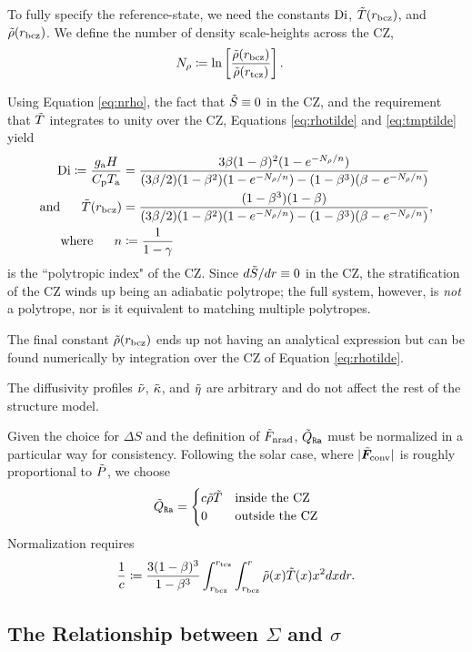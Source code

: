 \documentclass[12pt]{article}
\numberwithin{equation}{section}
\newcommand{\tmpa}{T_{\rm a}}
\newcommand{\ga}{g_{\rm a}}
\begin{document}
To fully specify the reference-state, we need the constants ${\rm{Di}}$, $\tilde{T}(r_{\rm bcz})$, and $\tilde{\rho}(r_{\rm bcz})$. We define the number of density scale-heights across the CZ, 
\begin{align}\label{eq:nrho}
	N_\rho &\coloneqq \ln\left[\frac{\tilde{\rho}(r_{\rm bcz})}{\tilde{\rho}(r_{\rm tcz})}\right].
\end{align}

Using Equation \eqref{eq:nrho}, the fact that $\tilde{S}\equiv0$ in the CZ, and the requirement that $\tilde{T}$ integrates to unity over the CZ, Equations \eqref{eq:rhotilde} and \eqref{eq:tmptilde} yield
\begin{align}\label{eq:digory}
	\di \define \frac{\ga H}{\cpcap\tmpa} &=  \frac{3 \beta (1 - \beta)^2 (1 - e^{-\nrho/n})} 
	{ (3\beta/2) (1 - \beta^2) (1 - e^{-\nrho/n}) - (1-\beta^3)(\beta-e^{-\nrho/n})}\\
	\andd \tmptilde(\rbcz)&= \frac{(1-\beta^3)(1-\beta)}{(3\beta/2)(1-\beta^2)(1-e^{-\nrho/n}) - (1-\beta^3)(\beta - e^{-\nrho/n})},\\
	\where n &\define \frac{1}{1-\gamma}
\end{align}
is the ``polytropic index" of the CZ. Since $d\tilde{S}/dr\equiv0$ in the CZ, the stratification of the CZ winds up being an adiabatic polytrope; the full system, however, is \textit{not} a polytrope, nor is it equivalent to matching multiple polytropes.

The final constant $\tilde{\rho}(r_{\rm bcz})$ ends up not having an analytical expression but can be found numerically by integration over the CZ of Equation \eqref{eq:rhotilde}.  

The diffusivity profiles $\tilde{\nu}$, $\tilde{\kappa}$, and $\tilde{\eta}$ are arbitrary and do not affect the rest of the structure model. 

Given the choice for $\Delta S$ and the definition of $\tilde{F}_{\rm nrad}$, $\tilde{Q}_{\texttt{Ra}}$ must be normalized in a particular way for consistency. Following the solar case, where $|\tilde{\bm{F}}_{\rm conv}|$ is roughly proportional to $\tilde{P}$, we choose
\begin{align}
	\tilde{Q}_{\texttt{Ra}} = \begin{cases}
		c\tilde{\rho}\tilde{T} &\text{inside the CZ}\\
		0 & \text{outside the CZ}
	\end{cases}
\end{align}
Normalization requires
\begin{align}
	\frac{1}{c} \coloneqq \frac{3(1-\beta)^3}{1-\beta^3}\int_{r_{\rm bcz}}^{r_{\rm tcz}}\int_{r_{\rm bcz}}^r \tilde{\rho}(x)\tilde{T}(x) x^2 dx dr. 
\end{align}
\subsection{The Relationship between $\Sigma$ and $\sigma$}


\clearpage
\newpage
%
	
\end{document}
